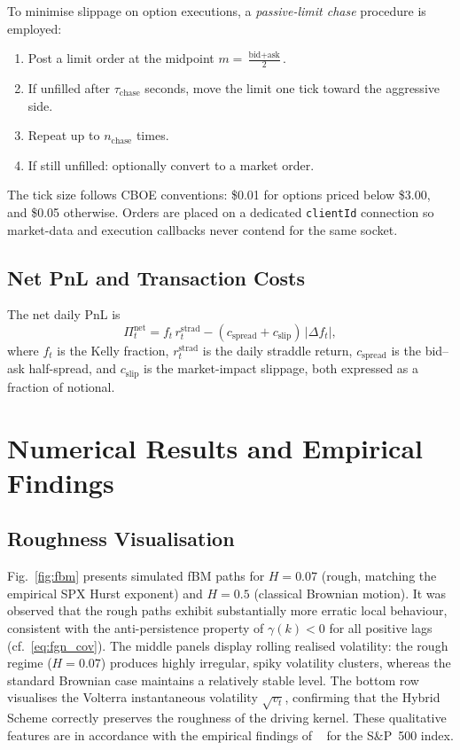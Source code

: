 \documentclass[conference]{IEEEtran}
\newcommand{\abs}[1]{\lvert #1 \rvert}
\begin{document}
To minimise slippage on option executions, a \emph{passive-limit chase}
procedure is employed:
\begin{enumerate}
  \item Post a limit order at the midpoint
        $m = \frac{\text{bid} + \text{ask}}{2}$.
  \item If unfilled after $\tau_{\text{chase}}$ seconds, move the
        limit one tick toward the aggressive side.
  \item Repeat up to $n_{\text{chase}}$ times.
  \item If still unfilled: optionally convert to a market order.
\end{enumerate}
The tick size follows CBOE conventions: \$0.01 for options priced
below \$3.00, and \$0.05 otherwise.  Orders are placed on a dedicated
\texttt{clientId} connection so market-data and execution callbacks
never contend for the same socket.

\subsection{Net PnL and Transaction Costs}

The net daily PnL is
\begin{equation}\label{eq:net_pnl}
  \Pi_t^{\text{net}} = f_t\, r_t^{\text{strad}}
    - (c_{\text{spread}} + c_{\text{slip}})\,\abs{\Delta f_t},
\end{equation}
where $f_t$ is the Kelly fraction, $r_t^{\text{strad}}$ is the
daily straddle return, $c_{\text{spread}}$ is the bid--ask
half-spread, and $c_{\text{slip}}$ is the market-impact slippage,
both expressed as a fraction of notional.

\section{Numerical Results and Empirical Findings}\label{sec:results}

\subsection{Roughness Visualisation}

Fig.~\ref{fig:fbm} presents simulated fBM paths for $H = 0.07$ (rough,
matching the empirical SPX Hurst exponent) and $H = 0.5$ (classical
Brownian motion).  It was observed that the rough paths exhibit
substantially more erratic local behaviour, consistent with the
anti-persistence property of $\gamma(k) < 0$ for all positive lags
(cf.~\eqref{eq:fgn_cov}).  The middle panels display rolling realised
volatility: the rough regime ($H = 0.07$) produces highly irregular,
spiky volatility clusters, whereas the standard Brownian case
maintains a relatively stable level.  The bottom row visualises the
Volterra instantaneous volatility $\sqrt{v_t}$, confirming that the
Hybrid Scheme correctly preserves the roughness of the driving kernel.
These qualitative features are in accordance with the empirical
findings of
\citeauthor{gatheral2018volatility}~\cite{gatheral2018volatility} for
the S\&P~500 index.
\end{document}
